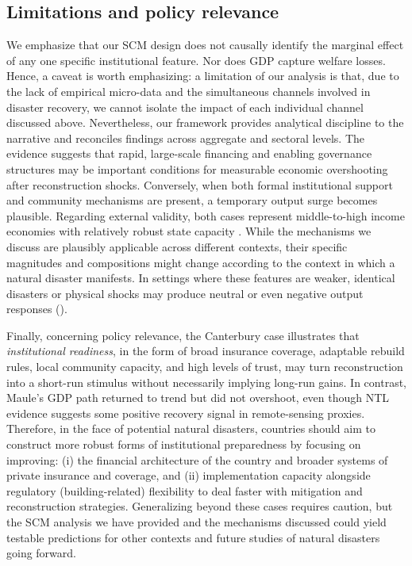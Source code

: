 \documentclass[12pt]{article}
\begin{document}
\subsection{Limitations and policy relevance}
We emphasize that our SCM design does not causally identify the marginal effect of any one specific institutional feature. Nor does GDP capture welfare losses. Hence, a caveat is worth emphasizing: a limitation of our analysis is that, due to the lack of empirical micro-data and the simultaneous channels involved in disaster recovery, we cannot isolate the impact of each individual channel discussed above. Nevertheless, our framework provides analytical discipline to the narrative and reconciles findings across aggregate and sectoral levels. The evidence suggests that rapid, large-scale financing and enabling governance structures may be important conditions for measurable economic overshooting after reconstruction shocks. Conversely, when both formal institutional support and community mechanisms are present, a temporary output surge becomes plausible. Regarding external validity, both cases represent middle-to-high income economies with relatively robust state capacity \parencite{miller2013estimating, gonzalez2020diversificacion}. While the mechanisms we discuss are plausibly applicable across different contexts, their specific magnitudes and compositions might change according to the context in which a natural disaster manifests. In settings where these features are weaker, identical disasters or physical shocks may produce neutral or even negative output responses (\cite{farzanegan2025bam, loayza2012natural}).

Finally, concerning policy relevance, the Canterbury case illustrates that \textit{institutional readiness}, in the form of broad insurance coverage, adaptable rebuild rules, local community capacity, and high levels of trust, may turn reconstruction into a short-run stimulus without necessarily implying long-run gains. In contrast, Maule’s GDP path returned to trend but did not overshoot, even though NTL evidence suggests some positive recovery signal in remote-sensing proxies. Therefore, in the face of potential natural disasters, countries should aim to construct more robust forms of institutional preparedness by focusing on improving: (i) the financial architecture of the country and broader systems of private insurance and coverage, and (ii) implementation capacity alongside regulatory (building-related) flexibility to deal faster with mitigation and reconstruction strategies. Generalizing beyond these cases requires caution, but the SCM analysis we have provided and the mechanisms discussed could yield testable predictions for other contexts and future studies of natural disasters going forward.
\end{document}
